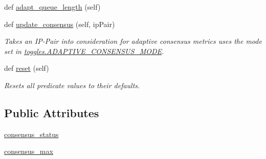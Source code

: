 \begin{DoxyCompactItemize}
\item 
def \hyperlink{classdynamicfilterapp_1_1models_1_1_predicate_a18b5417d8a8cf64ffbc6bb32c2a573fa}{adapt\+\_\+queue\+\_\+length} (self)
\item 
def \hyperlink{classdynamicfilterapp_1_1models_1_1_predicate_a34ad16d30b9a279473a83b2c43dedfa1}{update\+\_\+consensus} (self, ip\+Pair)
\begin{DoxyCompactList}\small\item\em Takes an I\+P-\/\+Pair into consideration for adaptive consensus metrics uses the mode set in \hyperlink{namespacedynamicfilterapp_1_1toggles_a394fa3f8531c2ecc987f982367a4af2d}{toggles.\+A\+D\+A\+P\+T\+I\+V\+E\+\_\+\+C\+O\+N\+S\+E\+N\+S\+U\+S\+\_\+\+M\+O\+DE}. \end{DoxyCompactList}\item 
def \hyperlink{classdynamicfilterapp_1_1models_1_1_predicate_a51829b63adb24ac48d350dee60181002}{reset} (self)
\begin{DoxyCompactList}\small\item\em Resets all predicate values to their defaults. \end{DoxyCompactList}\end{DoxyCompactItemize}
\subsection*{Public Attributes}
\begin{DoxyCompactItemize}
\item 
\hyperlink{classdynamicfilterapp_1_1models_1_1_predicate_aed00cc02057c0555b36ade73a3403506}{consensus\+\_\+status}
\item 
\hyperlink{classdynamicfilterapp_1_1models_1_1_predicate_a2b21ce84993e15a328a68bcbbe8986ef}{consensus\+\_\+max}
\end{DoxyCompactItemize}
